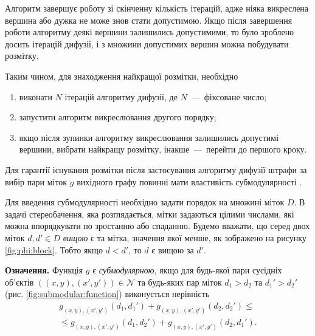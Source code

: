 Алгоритм завершує роботу зі скінченну кількість ітерацій,
адже ніяка викреслена вершина або дужка не може знов стати допустимою.
Якщо після завершення роботи алгоритму деякі вершини залишились допустимими,
то було зроблено досить ітерацій дифузії,
і з множини допустимих вершин можна побудувати розмітку.

Таким чином, для знаходження найкращої розмітки, необхідно
\begin{enumerate}
    \item виконати $N$ ітерацій алгоритму дифузії, де $N$~---~фіксоване число;
    \item запустити алгоритм викреслювання другого порядку;
    \item якщо після зупинки алгоритму викреслювання залишились
          допустимі вершини, вибрати найкращу розмітку,
          інакше~---~перейти до першого кроку.
\end{enumerate}

Для гарантії існування
розмітки після застосування алгоритму дифузії штрафи за вибір пари міток $g$
вихідного графу повинні мати властивість субмодулярності
\cite{diffusion:shlezinger:supermodularity}.

Для введення субмодулярності необхідно задати порядок на множині міток $D$.
В задачі стереобачення, яка розглядається, мітки задаються цілими числами,
які можна впорядкувати по зростанню або спаданню.
Будемо вважати, що серед двох міток $d, d' \in D$ \textit{вищою} є та мітка,
значення якої менше, як зображено на рисунку \ref{fig:phi:block}.
Тобто якщо $d < d'$, то $d$ є вищою за $d'$.

\textbf{Означення.}
Функція $g$ є \textit{субмодулярною}, якщо для будь-якої пари сусідніх об'єктів
$\left(\left(x, y \right), \left(x', y' \right) \right) \in \mathcal{N}$
та будь-яких пар міток $d_1 > d_2$ та $d_1' > d_2'$
(рис. \ref{fig:submodular:function}) виконується нерівність
\begin{equation} \label{submodular:function}
\begin{gathered}
    g_{\left(x, y \right), \left(x', y' \right)} \left(d_1, d_1' \right) +
    g_{\left(x, y \right), \left(x', y' \right)} \left(d_2, d_2' \right) \le \\
    \le g_{\left(x, y \right), \left(x', y' \right)} \left(d_1, d_2' \right) +
    g_{\left(x, y \right), \left(x', y' \right)} \left(d_2, d_1' \right).
\end{gathered}
\end{equation}

